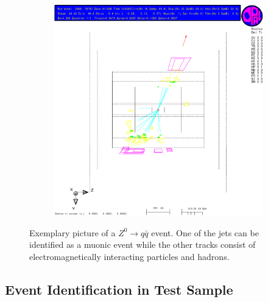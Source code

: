 \documentclass[11pt, a4paper]{article}
\numberwithin{equation}{section}
\begin{document}
\begin{figure}[h]
	\ContinuedFloat
	\begin{subfigure}{\textwidth}
		\centering
		\includegraphics[width=.9\textwidth]{./data/tag1/qq_pics/cropped/qq_04_side}
	\end{subfigure}
	\caption{Exemplary picture of a $Z^0\rightarrow q\bar{q}$ event. One of the jets can be identified as a muonic event while the other tracks consist of electromagnetically interacting particles and hadrons.}
\end{figure}
\clearpage

\subsection{Event Identification in Test Sample}
\end{document}
